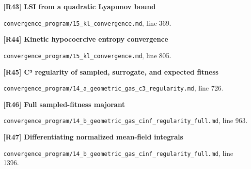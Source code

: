 \documentclass[11pt,a4paper]{article}
\begin{document}
\par\medskip\noindent\begin{minipage}{\linewidth}\textbf{[R43] LSI from a quadratic Lyapunov bound}\label{src:thm-unconditional-lsi}\par
{\small\texttt{}\par
\nolinkurl{convergence_program/15_kl_convergence.md}, line 369.\par}
\end{minipage}\par

\par\medskip\noindent\begin{minipage}{\linewidth}\textbf{[R44] Kinetic hypocoercive entropy convergence}\label{src:thm-villani-hypocoercivity}\par
{\small\texttt{}\par
\nolinkurl{convergence_program/15_kl_convergence.md}, line 805.\par}
\end{minipage}\par

\par\medskip\noindent\begin{minipage}{\linewidth}\textbf{[R45] C³ regularity of sampled, surrogate, and expected fitness}\label{src:thm-c3-regularity}\par
{\small\texttt{}\par
\nolinkurl{convergence_program/14_a_geometric_gas_c3_regularity.md}, line 726.\par}
\end{minipage}\par

\par\medskip\noindent\begin{minipage}{\linewidth}\textbf{[R46] Full sampled-fitness majorant}\label{src:thm-main-cinf-regularity-fitness-potential-full}\par
{\small\texttt{}\par
\nolinkurl{convergence_program/14_b_geometric_gas_cinf_regularity_full.md}, line 963.\par}
\end{minipage}\par

\par\medskip\noindent\begin{minipage}{\linewidth}\textbf{[R47] Differentiating normalized mean-field integrals}\label{src:thm-cinf-mean-field-integrals}\par
{\small\texttt{}\par
\nolinkurl{convergence_program/14_b_geometric_gas_cinf_regularity_full.md}, line 1396.\par}
\end{minipage}\par
\end{document}
